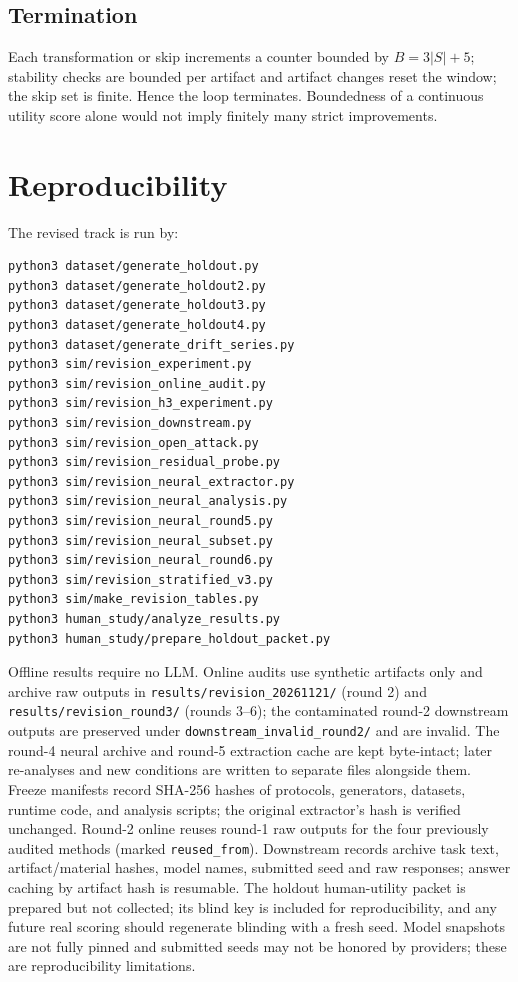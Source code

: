 \documentclass[11pt,a4paper]{article}
\begin{document}
\subsection{Termination}
Each transformation or skip increments a counter bounded by $B=3|S|+5$; stability checks are bounded per artifact and artifact changes reset the window; the skip set is finite. Hence the loop terminates. Boundedness of a continuous utility score alone would not imply finitely many strict improvements.

\section{Reproducibility}\label{app:repro}
The revised track is run by:
{\scriptsize
\begin{verbatim}
python3 dataset/generate_holdout.py
python3 dataset/generate_holdout2.py
python3 dataset/generate_holdout3.py
python3 dataset/generate_holdout4.py
python3 dataset/generate_drift_series.py
python3 sim/revision_experiment.py
python3 sim/revision_online_audit.py
python3 sim/revision_h3_experiment.py
python3 sim/revision_downstream.py
python3 sim/revision_open_attack.py
python3 sim/revision_residual_probe.py
python3 sim/revision_neural_extractor.py
python3 sim/revision_neural_analysis.py
python3 sim/revision_neural_round5.py
python3 sim/revision_neural_subset.py
python3 sim/revision_neural_round6.py
python3 sim/revision_stratified_v3.py
python3 sim/make_revision_tables.py
python3 human_study/analyze_results.py
python3 human_study/prepare_holdout_packet.py
\end{verbatim}
}
Offline results require no LLM. Online audits use synthetic artifacts only and archive raw outputs in \texttt{results/revision\_20261121/} (round 2) and \texttt{results/revision\_round3/} (rounds 3--6); the contaminated round-2 downstream outputs are preserved under \texttt{downstream\_invalid\_round2/} and are invalid. The round-4 neural archive and round-5 extraction cache are kept byte-intact; later re-analyses and new conditions are written to separate files alongside them. Freeze manifests record SHA-256 hashes of protocols, generators, datasets, runtime code, and analysis scripts; the original extractor's hash is verified unchanged. Round-2 online reuses round-1 raw outputs for the four previously audited methods (marked \texttt{reused\_from}). Downstream records archive task text, artifact/material hashes, model names, submitted seed and raw responses; answer caching by artifact hash is resumable. The holdout human-utility packet is prepared but not collected; its blind key is included for reproducibility, and any future real scoring should regenerate blinding with a fresh seed. Model snapshots are not fully pinned and submitted seeds may not be honored by providers; these are reproducibility limitations.
\end{document}
